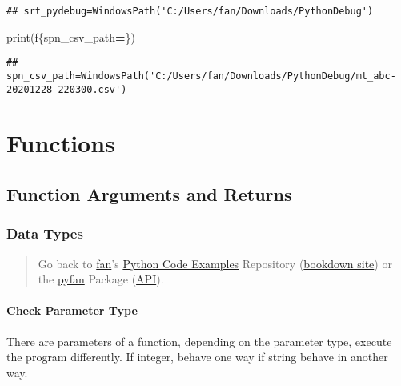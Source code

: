 \documentclass[
]{book}
\newenvironment{Shaded}{\begin{snugshade}}{\end{snugshade}}
\newcommand{\BuiltInTok}[1]{#1}
\newcommand{\NormalTok}[1]{#1}
\newcommand{\OperatorTok}[1]{\textcolor[rgb]{0.81,0.36,0.00}{\textbf{#1}}}
\newcommand{\SpecialCharTok}[1]{\textcolor[rgb]{0.00,0.00,0.00}{#1}}
\newcommand{\SpecialStringTok}[1]{\textcolor[rgb]{0.31,0.60,0.02}{#1}}
\begin{document}
\begin{verbatim}
## srt_pydebug=WindowsPath('C:/Users/fan/Downloads/PythonDebug')
\end{verbatim}

\begin{Shaded}
\begin{Highlighting}[]
\BuiltInTok{print}\NormalTok{(}\SpecialStringTok{f\textquotesingle{}}\SpecialCharTok{\{}\NormalTok{spn\_csv\_path}\OperatorTok{=}\SpecialCharTok{\}}\SpecialStringTok{\textquotesingle{}}\NormalTok{)}
\end{Highlighting}
\end{Shaded}

\begin{verbatim}
## spn_csv_path=WindowsPath('C:/Users/fan/Downloads/PythonDebug/mt_abc-20201228-220300.csv')
\end{verbatim}

\hypertarget{functions}{%
\chapter{Functions}\label{functions}}

\hypertarget{function-arguments-and-returns}{%
\section{Function Arguments and Returns}\label{function-arguments-and-returns}}

\hypertarget{data-types}{%
\subsection{Data Types}\label{data-types}}

\begin{quote}
Go back to \href{http://fanwangecon.github.io/}{fan}'s \href{https://fanwangecon.github.io/Py4Econ/}{Python Code Examples} Repository (\href{https://fanwangecon.github.io/Py4Econ/bookdown}{bookdown site}) or the \href{https://pyfan.readthedocs.io/en/latest/}{pyfan} Package (\href{https://pyfan.readthedocs.io/en/latest/reference.html}{API}).
\end{quote}

\hypertarget{check-parameter-type}{%
\subsubsection{Check Parameter Type}\label{check-parameter-type}}

There are parameters of a function, depending on the parameter type, execute the program differently. If integer, behave one way if string behave in another way.
\end{document}
